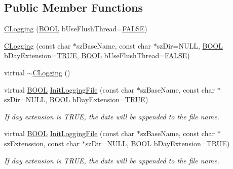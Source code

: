 \subsection*{\-Public \-Member \-Functions}
\begin{DoxyCompactItemize}
\item 
\hyperlink{class_c_logging_ac0d73e8afdfe8bf72747affb44cab82e}{\-C\-Logging} (\hyperlink{_cpclient_8h_a3be13892ae7076009afcf121347dd319}{\-B\-O\-O\-L} b\-Use\-Flush\-Thread=\hyperlink{_x_plat_8h_aa93f0eb578d23995850d61f7d61c55c1}{\-F\-A\-L\-S\-E})
\item 
\hyperlink{class_c_logging_aab79c1dfaa337956e76ab0159c2f538f}{\-C\-Logging} (const char $\ast$sz\-Base\-Name, const char $\ast$sz\-Dir=\-N\-U\-L\-L, \hyperlink{_cpclient_8h_a3be13892ae7076009afcf121347dd319}{\-B\-O\-O\-L} b\-Day\-Extension=\hyperlink{_x_plat_8h_aa8cecfc5c5c054d2875c03e77b7be15d}{\-T\-R\-U\-E}, \hyperlink{_cpclient_8h_a3be13892ae7076009afcf121347dd319}{\-B\-O\-O\-L} b\-Use\-Flush\-Thread=\hyperlink{_x_plat_8h_aa93f0eb578d23995850d61f7d61c55c1}{\-F\-A\-L\-S\-E})
\item 
virtual \hyperlink{class_c_logging_a9ef5d3a97150a1429f5c5c86a63aff18}{$\sim$\-C\-Logging} ()
\item 
virtual \hyperlink{_cpclient_8h_a3be13892ae7076009afcf121347dd319}{\-B\-O\-O\-L} \hyperlink{class_c_logging_a0a5d558fc74469ba80b8e48d001ce91c}{\-Init\-Logging\-File} (const char $\ast$sz\-Base\-Name, const char $\ast$sz\-Dir=\-N\-U\-L\-L, \hyperlink{_cpclient_8h_a3be13892ae7076009afcf121347dd319}{\-B\-O\-O\-L} b\-Day\-Extension=\hyperlink{_x_plat_8h_aa8cecfc5c5c054d2875c03e77b7be15d}{\-T\-R\-U\-E})
\begin{DoxyCompactList}\small\item\em \-If day extension is \-T\-R\-U\-E, the date will be appended to the file name. \end{DoxyCompactList}\item 
virtual \hyperlink{_cpclient_8h_a3be13892ae7076009afcf121347dd319}{\-B\-O\-O\-L} \hyperlink{class_c_logging_a1989ff79d5742c6f689669c1be529e4b}{\-Init\-Logging\-File} (const char $\ast$sz\-Base\-Name, const char $\ast$sz\-Extenssion, const char $\ast$sz\-Dir=\-N\-U\-L\-L, \hyperlink{_cpclient_8h_a3be13892ae7076009afcf121347dd319}{\-B\-O\-O\-L} b\-Day\-Extension=\hyperlink{_x_plat_8h_aa8cecfc5c5c054d2875c03e77b7be15d}{\-T\-R\-U\-E})
\begin{DoxyCompactList}\small\item\em \-If day extension is \-T\-R\-U\-E, the date will be appended to the file name. \end{DoxyCompactList}\item 

\end{DoxyCompactItemize}
